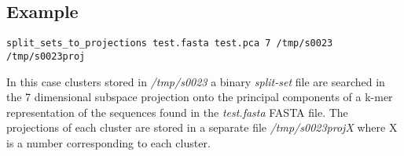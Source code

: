 \subsection{Example}

\begin{lstlisting}
split_sets_to_projections test.fasta test.pca 7 /tmp/s0023 /tmp/s0023proj
\end{lstlisting}
In this case clusters stored in \emph{/tmp/s0023} a binary
\emph{split-set} file are searched in the 7 dimensional subspace
projection onto the principal components of a k-mer representation of
the sequences found in the \emph{test.fasta} FASTA file. The
projections of each cluster are stored in a separate file
\emph{/tmp/s0023projX} where X is a number corresponding to each
cluster. 
